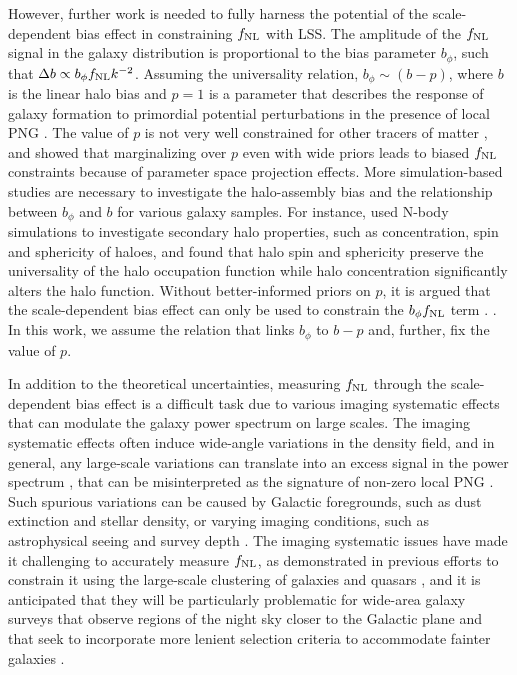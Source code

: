 However, further work is needed to fully harness the potential of the scale-dependent bias effect in constraining $f_{\rm NL}$ with LSS. The amplitude of the $f_{\rm NL}$ signal in the galaxy distribution is proportional to the bias parameter $b_{\phi}$, such that $\Delta b \propto b_{\phi}f_{\rm NL} k^{-2}$. Assuming the universality relation, $b_{\phi} \sim (b - p)$, where $b$ is the linear halo bias and $p=1$ is a parameter that describes the response of galaxy formation to primordial potential perturbations in the presence of local PNG \citep[see, e.g.,][]{slosar2008constraints}. The value of $p$ is not very well constrained for other tracers of matter \citep{2020JCAP...12..013B, 2020JCAP...12..031B}, and \cite{2022JCAP...11..013B} showed that marginalizing over $p$ even with wide priors leads to biased $f_{\rm NL}$ constraints because of parameter space projection effects. More simulation-based studies are necessary to investigate the halo-assembly bias and the relationship between $b_{\phi}$ and $b$ for various galaxy samples. For instance, \cite{2023JCAP...01..023L} used N-body simulations to investigate secondary halo properties, such as concentration, spin and sphericity of haloes, and found that halo spin and sphericity preserve the universality of the halo occupation function while halo concentration significantly alters the halo function.  Without better-informed priors on $p$, it is argued that the scale-dependent bias effect can only be used to constrain the $b_{\phi}f_{\rm NL}$ term \citep[see, e.g.,][]{2020JCAP...12..031B}. . In this work, we assume the relation that links $b_{\phi}$ to $b-p$ and, further, fix the value of $p$.  

In addition to the theoretical uncertainties, measuring $f_{\rm NL}$ through the scale-dependent bias effect is a difficult task due to various imaging systematic effects that can modulate the galaxy power spectrum on large scales. The imaging systematic effects often induce wide-angle variations in the density field, and in general, any large-scale variations can translate into an excess signal in the power spectrum \citep[see, e.g.,][]{huterer2013calibration}, that can be misinterpreted as the signature of non-zero local PNG \citep[see, e.g.,][]{PhysRevLett.106.241301}. Such spurious variations can be caused by Galactic foregrounds, such as dust extinction and stellar density, or varying imaging conditions, such as astrophysical seeing and survey depth \citep[see, e.g.,][]{ross2011}. The imaging systematic issues have made it challenging to accurately measure $f_{\rm NL}$, as demonstrated in previous efforts to constrain it using the large-scale clustering of galaxies and quasars \citep[see, e.g.,][]{2013MNRAS.428.1116R,pullen2013systematic, Ho2015JCAP...05..040H}, and it is anticipated that they will be particularly problematic for wide-area galaxy surveys that observe regions of the night sky closer to the Galactic plane and that seek to incorporate more lenient selection criteria to accommodate fainter galaxies \citep[see, e.g,][]{kitanidis2020imaging}.

